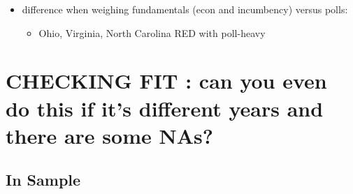 \documentclass[
]{article}
\providecommand{\tightlist}{%
  \setlength{\itemsep}{0pt}\setlength{\parskip}{0pt}}
\begin{document}
\begin{itemize}
\tightlist
\item
  difference when weighing fundamentals (econ and incumbency) versus
  polls:

  \begin{itemize}
  \tightlist
  \item
    Ohio, Virginia, North Carolina RED with poll-heavy
  \end{itemize}
\end{itemize}

\hypertarget{checking-fit-can-you-even-do-this-if-its-different-years-and-there-are-some-nas}{%
\section{CHECKING FIT : can you even do this if it's different years and
there are some
NAs?}\label{checking-fit-can-you-even-do-this-if-its-different-years-and-there-are-some-nas}}

\hypertarget{in-sample}{%
\subsection{In Sample}\label{in-sample}}
\end{document}
